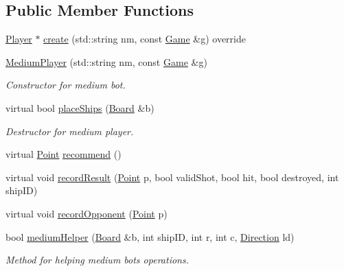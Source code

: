 \subsection*{Public Member Functions}
\begin{DoxyCompactItemize}
\item 
\mbox{\hyperlink{class_player}{Player}} $\ast$ \mbox{\hyperlink{class_medium_player_a7a681c6bebf67740d1919339bd423ac5}{create}} (std\+::string nm, const \mbox{\hyperlink{class_game}{Game}} \&g) override
\item 
\mbox{\label{class_medium_player_a76923857c4fa54d192ed4644c72bce2d}} 
\mbox{\hyperlink{class_medium_player_a76923857c4fa54d192ed4644c72bce2d}{Medium\+Player}} (std\+::string nm, const \mbox{\hyperlink{class_game}{Game}} \&g)
\begin{DoxyCompactList}\small\item\em Constructor for medium bot. \end{DoxyCompactList}\item 
virtual bool \mbox{\hyperlink{class_medium_player_ac4d4748e2c27a2a51033bbce9f12de26}{place\+Ships}} (\mbox{\hyperlink{class_board}{Board}} \&b)
\begin{DoxyCompactList}\small\item\em Destructor for medium player. \end{DoxyCompactList}\item 
virtual \mbox{\hyperlink{class_point}{Point}} \mbox{\hyperlink{class_medium_player_a2e99d57f30f3f7f929840b8cda16527d}{recommend}} ()
\item 
virtual void \mbox{\hyperlink{class_medium_player_aeadd8498cba5c447afbb5a0eb7408285}{record\+Result}} (\mbox{\hyperlink{class_point}{Point}} p, bool valid\+Shot, bool hit, bool destroyed, int ship\+ID)
\item 
virtual void \mbox{\hyperlink{class_medium_player_a6183d4a8fe3d68419afcfa9e33cd5928}{record\+Opponent}} (\mbox{\hyperlink{class_point}{Point}} p)
\item 
bool \mbox{\hyperlink{class_medium_player_a502c34f56cfe60def6d01de7c4f300e2}{medium\+Helper}} (\mbox{\hyperlink{class_board}{Board}} \&b, int ship\+ID, int r, int c, \mbox{\hyperlink{_globals_8h_a224b9163917ac32fc95a60d8c1eec3aa}{Direction}} ld)
\begin{DoxyCompactList}\small\item\em Method for helping medium bot\textquotesingle{}s operations. \end{DoxyCompactList}\item 

\end{DoxyCompactItemize}
